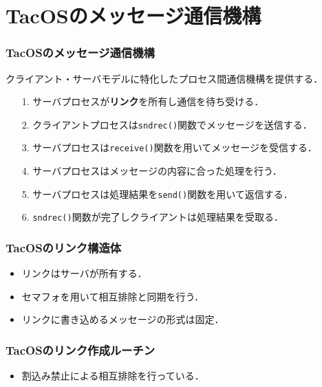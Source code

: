 \documentclass[unicode]{beamer}                   %
\begin{document}
\section{TacOSのメッセージ通信機構}
\begin{frame}
  \frametitle{TacOSのメッセージ通信機構}
  クライアント・サーバモデルに特化したプロセス間通信機構を提供する．
  \vfill
  \vfill
  \begin{enumerate}
  \item[1.] サーバプロセスが{\bf リンク}を所有し通信を待ち受ける．
  \item[2.] クライアントプロセスは{\tt sndrec()}関数でメッセージを送信する．
  \item[3.] サーバプロセスは{\tt receive()}関数を用いてメッセージを受信する．
  \item[4.] サーバプロセスはメッセージの内容に合った処理を行う．
  \item[5.] サーバプロセスは処理結果を{\tt send()}関数を用いて返信する．
  \item[6.] {\tt sndrec()}関数が完了しクライアントは処理結果を受取る．
  \end{enumerate}
  \vfill
\end{frame}

\begin{frame}
  \frametitle{TacOSのリンク構造体}
  \begin{itemize}
  \item リンクはサーバが所有する．
  \item セマフォを用いて相互排除と同期を行う．
  \item リンクに書き込めるメッセージの形式は固定．
  \end{itemize}
\end{frame}

\begin{frame}
  \frametitle{TacOSのリンク作成ルーチン}
  \begin{itemize}
  \item 割込み禁止による相互排除を行っている．
  \end{itemize}
\end{frame}
\end{document}
